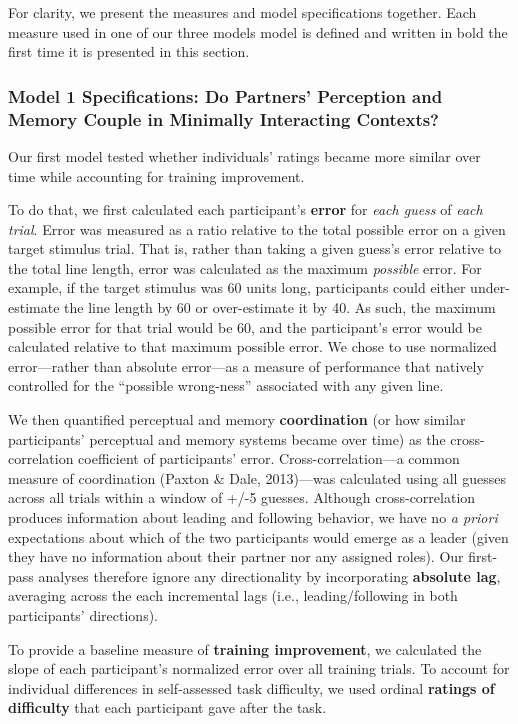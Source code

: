 \documentclass[10pt, letterpaper]{article}
\begin{document}
For clarity, we present the measures and model specifications together.
Each measure used in one of our three models model is defined and
written in bold the first time it is presented in this section.

\subsubsection{Model 1 Specifications: Do Partners' Perception and
Memory Couple in Minimally Interacting
Contexts?}\label{model-1-specifications-do-partners-perception-and-memory-couple-in-minimally-interacting-contexts}

Our first model tested whether individuals' ratings became more similar
over time while accounting for training improvement.

To do that, we first calculated each participant's \textbf{error} for
\emph{each guess} of \emph{each trial}. Error was measured as a ratio
relative to the total possible error on a given target stimulus trial.
That is, rather than taking a given guess's error relative to the total
line length, error was calculated as the maximum \emph{possible} error.
For example, if the target stimulus was 60 units long, participants
could either under-estimate the line length by 60 or over-estimate it by
40. As such, the maximum possible error for that trial would be 60, and
the participant's error would be calculated relative to that maximum
possible error. We chose to use normalized error---rather than absolute
error---as a measure of performance that natively controlled for the
``possible wrong-ness'' associated with any given line.

We then quantified perceptual and memory \textbf{coordination} (or how
similar participants' perceptual and memory systems became over time) as
the cross-correlation coefficient of participants' error.
Cross-correlation---a common measure of coordination (Paxton \& Dale,
2013)---was calculated using all guesses across all trials within a
window of +/-5 guesses. Although cross-correlation produces information
about leading and following behavior, we have no \emph{a priori}
expectations about which of the two participants would emerge as a
leader (given they have no information about their partner nor any
assigned roles). Our first-pass analyses therefore ignore any
directionality by incorporating \textbf{absolute lag}, averaging across
the each incremental lags (i.e., leading/following in both participants'
directions).

To provide a baseline measure of \textbf{training improvement}, we
calculated the slope of each participant's normalized error over all
training trials. To account for individual differences in self-assessed
task difficulty, we used ordinal \textbf{ratings of difficulty} that
each participant gave after the task.
\end{document}
